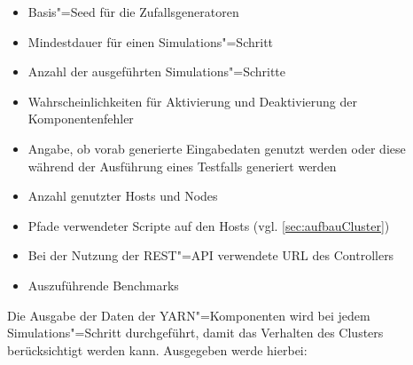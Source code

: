 \begin{itemize}
    \item Basis"=Seed für die Zufallsgeneratoren
    \item Mindestdauer für einen Simulations"=Schritt
    \item Anzahl der ausgeführten Simulations"=Schritte
    \item Wahrscheinlichkeiten für Aktivierung und Deaktivierung der Komponentenfehler
    \item Angabe, ob vorab generierte Eingabedaten genutzt werden oder diese während der Ausführung eines Testfalls generiert werden
    \item Anzahl genutzter Hosts und Nodes
    \item Pfade verwendeter Scripte auf den Hosts (vgl. \autoref{sec:aufbauCluster})
    \item Bei der Nutzung der REST"=API verwendete URL des Controllers
    \item Auszuführende Benchmarks    
\end{itemize}

Die Ausgabe der Daten der YARN"=Komponenten wird bei jedem Simulations"=Schritt durchgeführt, damit das Verhalten des Clusters berücksichtigt werden kann.
Ausgegeben werde hierbei:

